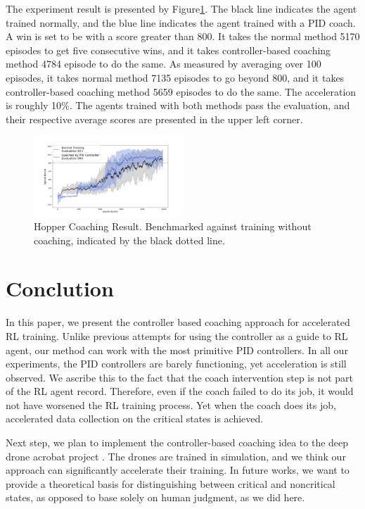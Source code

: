 \documentclass[journal]{IEEEtran}
\begin{document}
The experiment result is presented by Figure\ref{fig:walker_result}. The black line indicates the agent trained normally, and the blue line indicates the agent trained with a PID coach. A win is set to be with a score greater than 800. It takes the normal method 5170 episodes to get five consecutive wins, and it takes controller-based coaching method 4784 episode to do the same. As measured by averaging over 100 episodes, it takes normal method 7135 episodes to go beyond 800, and it takes controller-based coaching method 5659 episodes to do the same. The acceleration is roughly 10\%. The agents trained with both methods pass the evaluation, and their respective average scores are presented in the upper left corner.



\begin{figure}
     \centering
      \includegraphics[width=0.5\textwidth]{walker.png}
      \caption{Hopper Coaching Result. Benchmarked against training without coaching, indicated by the black dotted line.}
      \label{fig:walker_result}
\end{figure}





\section{Conclution}

In this paper, we present the controller based coaching approach for accelerated RL training. Unlike previous attempts for using the controller as a guide to RL agent, our method can work with the most primitive PID controllers. In all our experiments, the PID controllers are barely functioning, yet acceleration is still observed. We ascribe this to the fact that the coach intervention step is not part of the RL agent record. Therefore, even if the coach failed to do its job, it would not have worsened the RL training process. Yet when the coach does its job, accelerated data collection on the critical states is achieved. 

Next step, we plan to implement the controller-based coaching idea to the deep drone acrobat project \cite{Kaufmann2020DeepDA}. The drones are trained in simulation, and we think our approach can significantly accelerate their training. In future works, we want to provide a theoretical basis for distinguishing between critical and noncritical states, as opposed to base solely on human judgment, as we did here. 
\end{document}
